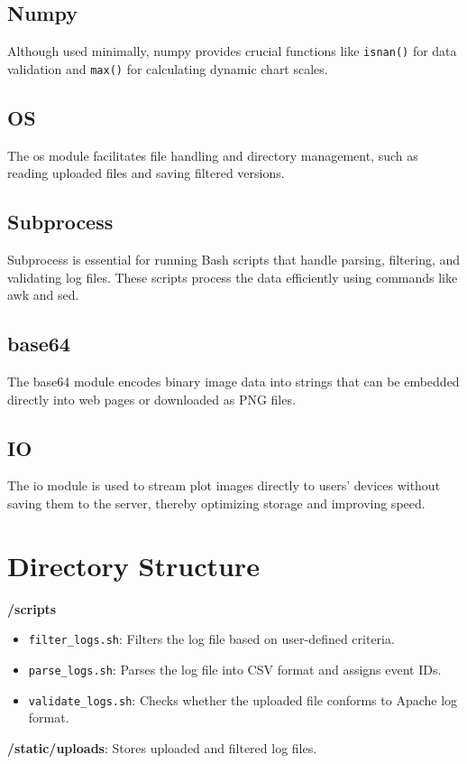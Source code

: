 \documentclass{article}
\begin{document}
\subsection{Numpy}
Although used minimally, numpy provides crucial functions like \texttt{isnan()} for data validation and \texttt{max()} for calculating dynamic chart scales.

\subsection{OS}
The os module facilitates file handling and directory management, such as reading uploaded files and saving filtered versions.

\subsection{Subprocess}
Subprocess is essential for running Bash scripts that handle parsing, filtering, and validating log files. These scripts process the data efficiently using commands like awk and sed.

\subsection{base64}
The base64 module encodes binary image data into strings that can be embedded directly into web pages or downloaded as PNG files.

\subsection{IO}
The io module is used to stream plot images directly to users' devices without saving them to the server, thereby optimizing storage and improving speed.

\section{Directory Structure}
\textbf{/scripts}
\begin{itemize}
    \item \texttt{filter\_logs.sh}: Filters the log file based on user-defined criteria.
    \item \texttt{parse\_logs.sh}: Parses the log file into CSV format and assigns event IDs.
    \item \texttt{validate\_logs.sh}: Checks whether the uploaded file conforms to Apache log format.
\end{itemize}
\textbf{/static/uploads}: Stores uploaded and filtered log files.
\end{document}
